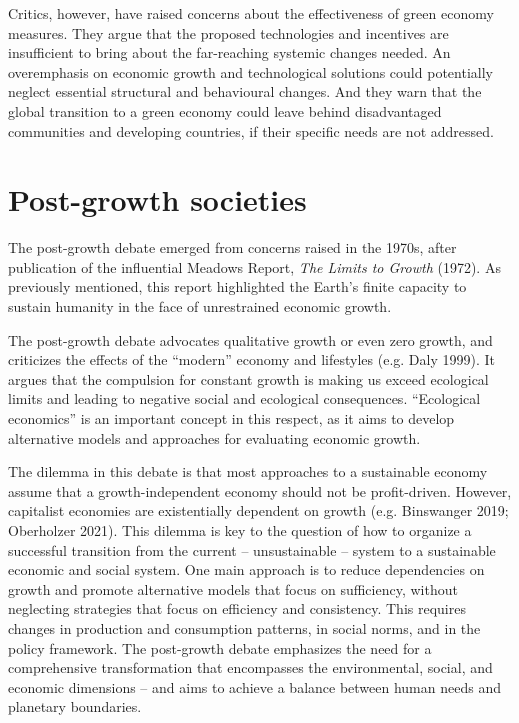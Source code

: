 \documentclass[
  a4paper,
  DIV=11,
  numbers=noendperiod,
  oneside,
  openany]{scrreprt}
\begin{document}
Critics, however, have raised concerns about the effectiveness of green
economy measures. They argue that the proposed technologies and
incentives are insufficient to bring about the far-reaching systemic
changes needed. An overemphasis on economic growth and technological
solutions could potentially neglect essential structural and behavioural
changes. And they warn that the global transition to a green economy
could leave behind disadvantaged communities and developing countries,
if their specific needs are not addressed.

\section{Post-growth societies}\label{post-growth-societies}

The post-growth debate emerged from concerns raised in the 1970s, after
publication of the influential Meadows Report, \emph{The Limits to
Growth} (1972). As previously mentioned, this report highlighted the
Earth's finite capacity to sustain humanity in the face of unrestrained
economic growth.

The post-growth debate advocates qualitative growth or even zero growth,
and criticizes the effects of the ``modern'' economy and lifestyles
(e.g. Daly 1999). It argues that the compulsion for constant growth is
making us exceed ecological limits and leading to negative social and
ecological consequences. ``Ecological economics'' is an important
concept in this respect, as it aims to develop alternative models and
approaches for evaluating economic growth.

The dilemma in this debate is that most approaches to a sustainable
economy assume that a growth-independent economy should not be
profit-driven. However, capitalist economies are existentially dependent
on growth (e.g. Binswanger 2019; Oberholzer 2021). This dilemma is key
to the question of how to organize a successful transition from the
current -- unsustainable -- system to a sustainable economic and social
system. One main approach is to reduce dependencies on growth and
promote alternative models that focus on sufficiency, without neglecting
strategies that focus on efficiency and consistency. This requires
changes in production and consumption patterns, in social norms, and in
the policy framework. The post-growth debate emphasizes the need for a
comprehensive transformation that encompasses the environmental, social,
and economic dimensions -- and aims to achieve a balance between human
needs and planetary boundaries.
\end{document}
